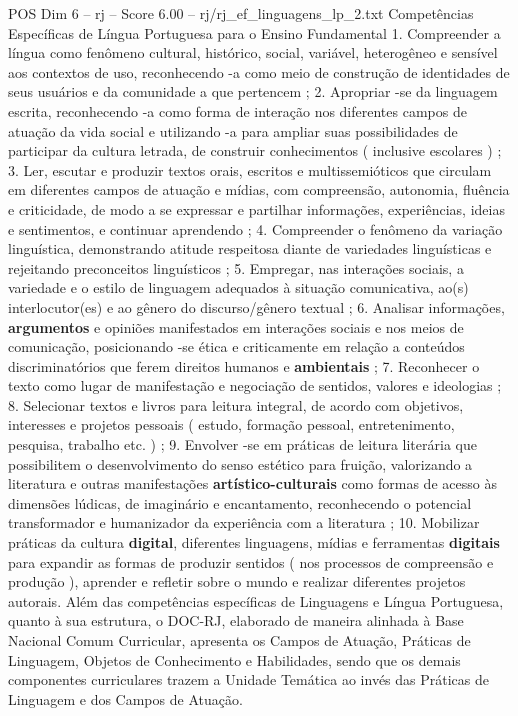 \begin{textsample}{POS Dim 6 – rj – Score 6.00 – rj/rj\_ef\_linguagens\_lp\_2.txt}
Competências Específicas de Língua Portuguesa para o Ensino Fundamental 1.
Compreender a língua como fenômeno cultural, histórico, social, variável, heterogêneo e sensível aos contextos de uso, reconhecendo -a como meio de construção de identidades de seus usuários e da comunidade a que pertencem ; 2.
Apropriar -se da linguagem escrita, reconhecendo -a como forma de interação nos diferentes campos de atuação da vida social e utilizando -a para ampliar suas possibilidades de participar da cultura letrada, de construir conhecimentos ( inclusive escolares ) ; 3.
Ler, escutar e produzir textos orais, escritos e multissemióticos que circulam em diferentes campos de atuação e mídias, com compreensão, autonomia, fluência e criticidade, de modo a se expressar e partilhar informações, experiências, ideias e sentimentos, e continuar aprendendo ; 4.
Compreender o fenômeno da variação linguística, demonstrando atitude respeitosa diante de variedades linguísticas e rejeitando preconceitos linguísticos ; 5.
Empregar, nas interações sociais, a variedade e o estilo de linguagem adequados à situação comunicativa, ao(s) interlocutor(es) e ao gênero do discurso/gênero textual ; 6.
Analisar informações, \textbf{argumentos} e opiniões manifestados em interações sociais e nos meios de comunicação, posicionando -se ética e criticamente em relação a conteúdos discriminatórios que ferem direitos humanos e \textbf{ambientais} ; 7.
Reconhecer o texto como lugar de manifestação e negociação de sentidos, valores e ideologias ; 8.
Selecionar textos e livros para leitura integral, de acordo com objetivos, interesses e projetos pessoais ( estudo, formação pessoal, entretenimento, pesquisa, trabalho etc. ) ; 9.
Envolver -se em práticas de leitura literária que possibilitem o desenvolvimento do senso estético para fruição, valorizando a literatura e outras manifestações \textbf{artístico-culturais} como formas de acesso às dimensões lúdicas, de imaginário e encantamento, reconhecendo o potencial transformador e humanizador da experiência com a literatura ; 10.
Mobilizar práticas da cultura \textbf{digital}, diferentes linguagens, mídias e ferramentas \textbf{digitais} para expandir as formas de produzir sentidos ( nos processos de compreensão e produção ), aprender e refletir sobre o mundo e realizar diferentes projetos autorais.
Além das competências específicas de Linguagens e Língua Portuguesa, quanto à sua estrutura, o DOC-RJ, elaborado de maneira alinhada à Base Nacional Comum Curricular, apresenta os Campos de Atuação, Práticas de Linguagem, Objetos de Conhecimento e Habilidades, sendo que os demais componentes curriculares trazem a Unidade Temática ao invés das Práticas de Linguagem e dos Campos de Atuação.

\end{textsample}
